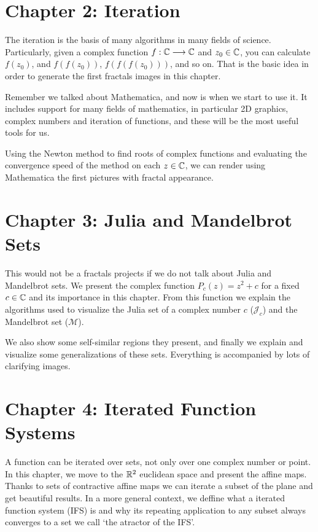 \section*{Chapter 2: Iteration}

The iteration is the basis of many algorithms in many fields of science. Particularly, given a complex function $f:\mathbb{C}\longrightarrow\mathbb{C}$ and $z_0\in\mathbb{C}$, you can calculate $f(z_0)$, and $f(f(z_0))$, $f(f(f(z_0)))$, and so on. That is the basic idea in order to generate the first fractals images in this chapter.

Remember we talked about Mathematica, and now is when we start to use it. It includes support for many fields of mathematics, in particular 2D graphics, complex numbers and iteration of functions, and these will be the most useful tools for us. 

Using the Newton method to find roots of complex functions and evaluating the convergence speed of the method on each $z\in\mathbb{C}$, we can render using Mathematica the first pictures with fractal appearance.

\section*{Chapter 3: Julia and Mandelbrot Sets}

This would not be a fractals projects if we do not talk about Julia and Mandelbrot sets. We present the complex function $P_c(z)=z^2 +c$ for a fixed $c\in\mathbb{C}$ and its importance in this chapter. From this function we explain the algorithms used to visualize the Julia set of a complex number $c$ ($\mathcal{J}_c$) and the Mandelbrot set ($\mathcal{M}$). 

We also show some self-similar regions they present, and finally we explain and visualize some generalizations of these sets. Everything is accompanied by lots of clarifying images.

\section*{Chapter 4: Iterated Function Systems}

A function can be iterated over sets, not only over one complex number or point. In this chapter, we move to the $\mathbb{R}^2$ euclidean space and present the affine maps. Thanks to sets of contractive affine maps we can iterate a subset of the plane and get beautiful results. In a more general context, we deffine what a iterated function system (IFS) is and why its repeating application to any subset always converges to a set we call `the atractor of the IFS'.

